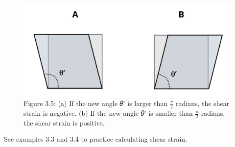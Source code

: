 \documentclass[
  letterpaper,
  DIV=11,
  numbers=noendperiod]{scrreprt}
\begin{document}
\begin{figure}[H]

{\centering \includegraphics[width=5.05208in,height=\textheight]{images/CH3 PNGs/figure 3.5.png}

}

\caption{Figure 3.5: (a) If the new angle 𝜃' is larger than
\(\frac{\pi}{2}\) radians, the shear strain is negative. (b) If the new
angle 𝜃' is smaller than \(\frac{\pi}{2}\) radians, the shear strain is
positive.}

\end{figure}%

See examples 3.3 and 3.4 to practice calculating shear strain.
\end{document}
